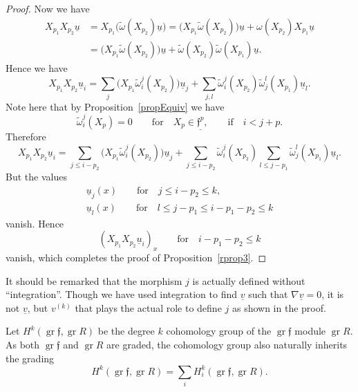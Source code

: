 \documentclass[10pt,a4paper]{amsart}
\newcommand{\f}{\mathfrak f}
\newcommand{\gr}{\operatorname{gr}}
\numberwithin{equation}{section}
\begin{document}
\begin{proof}
Now we have
\begin{align*}
	X_{p_1}X_{p_2}\underline u &= X_{p_1} \big( \tilde\omega(X_{p_2})\underline u\big)
	= \big( X_{p_1} \tilde\omega(X_{p_2})\big)\underline u
	+ \omega(X_{p_2})X_{p_1}\underline u
\\
	&= \big( X_{p_1} \tilde\omega(X_{p_2})\big)\underline u
	+ \tilde\omega(X_{p_2})\tilde\omega(X_{p_1})\underline u.
\end{align*}
Hence we have
\[
	X_{p_1}X_{p_2}\underline u_i = \sum_j \big(X_{p_1}\tilde\omega^j_i(X_{p_2})\big)\underline u_j
	+ \sum_{j,l} \tilde\omega^j_i(X_{p_2})\tilde\omega^l_j(X_{p_1})\underline u_l.
\]
Note here that by Proposition~\ref{propEquiv} we have
\[
	\tilde\omega^j_i(X_p) = 0 \qquad\text{for}\quad X_p\in\underline{\f^p},\qquad\text{if}\quad i<j+p.
\]
Therefore
\[
X_{p_1}X_{p_2}\underline u_i = \sum_{j\le i-p_2}\big(X_{p_1}\tilde\omega^j_i(X_{p_2})\big)
\underline u_j
+ \sum_{j\le i-p_2} \tilde\omega^j_i(X_{p_2})\sum_{l\le j-p_1}\tilde\omega^l_j(X_{p_1})\underline u_l.
\]
But the values
\begin{gather*}
\underline u_j(x) \qquad\text{for}\quad j\le i-p_2\le k,
\\
\underline u_l(x) \qquad\text{for}\quad l\le j-p_1\le i-p_1-p_2\le k
\end{gather*}
vanish. Hence
\[
	(X_{p_1}X_{p_2}\underline u_i)_x \qquad\text{for}\quad i-p_1-p_2\le k
\]
vanish, which completes the proof of Proposition~\ref{rprop3}.
\end{proof}

It should be remarked that the morphism $j$ is actually defined without ``integration''.
Though we have used integration to find $\underline v$ such that $\nabla \underline v = 0$, it is not $\underline v$, but $v^{(k)}$ that plays the actual role to define $j$ as shown in the proof.


Let $H^k(\gr\f,\gr R)$ be the degree $k$ cohomology group of the $\gr\f$ module $\gr R$. As both $\gr\f$ and $\gr R$ are graded, the cohomology group also naturally inherits the grading
\[
	H^k(\gr\f,\gr R) = \sum_i H^k_i(\gr\f,\gr R).
\]
\end{document}
